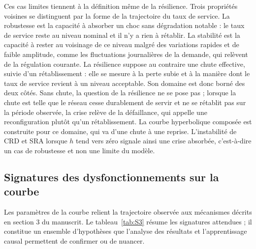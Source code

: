 Ces cas limites tiennent à la définition même de la résilience. Trois propriétés voisines se distinguent par la forme de la trajectoire du taux de service. La robustesse est la capacité à absorber un choc sans dégradation notable : le taux de service reste au niveau nominal et il n'y a rien à rétablir. La stabilité est la capacité à rester au voisinage de ce niveau malgré des variations rapides et de faible amplitude, comme les fluctuations journalières de la demande, qui relèvent de la régulation courante. La résilience suppose au contraire une chute effective, suivie d'un rétablissement : elle se mesure à la perte subie et à la manière dont le taux de service revient à un niveau acceptable. Son domaine est donc borné des deux côtés. Sans chute, la question de la résilience ne se pose pas ; lorsque la chute est telle que le réseau cesse durablement de servir et ne se rétablit pas sur la période observée, la crise relève de la défaillance, qui appelle une reconfiguration plutôt qu'un rétablissement. La courbe hyperbolique composée \citep{rahiel2026in4pl} est construite pour ce domaine, qui va d'une chute à une reprise. L'instabilité de CRD et SRA lorsque $h$ tend vers zéro signale ainsi une crise absorbée, c'est-à-dire un cas de robustesse et non une limite du modèle.

\subsection{Signatures des dysfonctionnements sur la courbe}
\label{sec:S4.4}

Les paramètres de la courbe relient la trajectoire observée aux mécanismes décrits en section 3 du manuscrit. Le tableau~\ref{tab:S3} résume les signatures attendues ; il constitue un ensemble d'hypothèses que l'analyse des résultats et l'apprentissage causal permettent de confirmer ou de nuancer.

